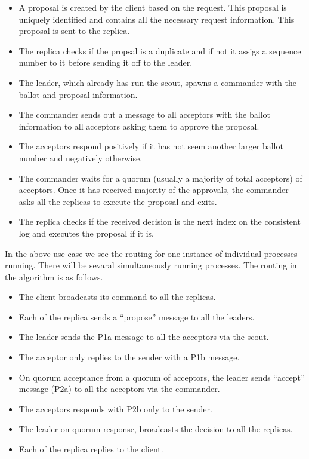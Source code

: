 \begin{itemize}
    \item A proposal is created by the client based on the request. This
      proposal is uniquely identified and contains all the necessary request
      information. This proposal is sent to the replica.
    \item The replica checks if the propsal is a duplicate and if not it
      assigs a sequence number%
      to it before sending it off to the leader.
    \item The leader, which already has run the scout, spawns a commander with
      the ballot and proposal information.
    \item The commander sends out a message to all acceptors with the ballot
      information to all acceptors asking them to approve the proposal.
    \item The acceptors respond positively if it has not seem another larger
      ballot number and negatively otherwise.
    \item The commander waits for a quorum (usually a majority of total
      acceptors) of acceptors. Once it has received majority of the approvals,
      the commander asks all the replicas to execute the proposal and exits.
    \item The replica checks if the received decision is the next index on
      the consistent log and executes the proposal if it is.
\end{itemize}

In the above use case we see the routing for one instance of individual
processes running. There will be sevaral simultaneously running processes. The
routing in the algorithm is as follows.

\begin{itemize}
  \item The client broadcasts its command to all the replicas.
  \item Each of the replica sends a ``propose'' message to all the leaders.
  \item The leader sends the P1a message to all the acceptors via the scout.
  \item The acceptor only replies to the sender with a P1b message.
  \item On quorum acceptance from a quorum of acceptors, the leader sends
    ``accept'' message (P2a) to all the acceptors via the commander.
  \item The acceptors responds with P2b only to the sender.
  \item The leader on quorum response, broadcasts the decision to all the
    replicas.
  \item Each of the replica replies to the client.
\end{itemize}


